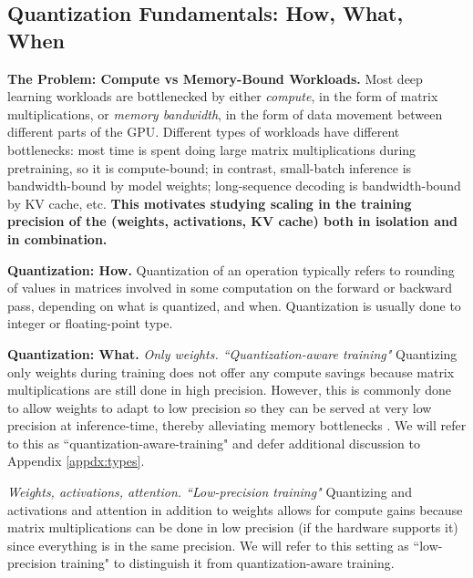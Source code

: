 \documentclass[11pt]{article}
\begin{document}
\subsection{Quantization Fundamentals: How, What, When}


\textbf{The Problem: Compute vs Memory-Bound Workloads.} Most deep learning workloads are bottlenecked by either \textit{compute}, in the form of matrix multiplications, or \textit{memory bandwidth}, in the form of data movement between different parts of the GPU. Different types of workloads have different bottlenecks: most time is spent doing large matrix multiplications during pretraining, so it is compute-bound; in contrast, small-batch inference is bandwidth-bound by model weights; long-sequence decoding is bandwidth-bound by KV cache, etc. \textbf{This motivates studying scaling in the training precision of the (weights, activations, KV cache) both in isolation and in combination. }


\textbf{Quantization: How.} Quantization of an operation typically refers to rounding of values in matrices involved in some computation on the forward or backward pass, depending on what is quantized, and when. Quantization is usually done to integer or floating-point type.

\textbf{Quantization: What.} \textit{Only weights. ``Quantization-aware training"} Quantizing only weights during training does not offer any compute savings because matrix multiplications are still done in high precision. However, this is commonly done to allow weights to adapt to low precision so they can be served at very low precision at inference-time, thereby alleviating memory bottlenecks \citep{ma2024era, wang2023bitnet}. We will refer to this as ``quantization-aware-training" and defer additional discussion to Appendix \ref{appdx:types}. 


\textit{Weights, activations, attention. ``Low-precision training"} Quantizing and activations and attention in addition to weights allows for compute gains because matrix multiplications can be done in low precision (if the hardware supports it) since everything is in the same precision. We will refer to this setting as ``low-precision training" to distinguish it from quantization-aware training.  
\end{document}
